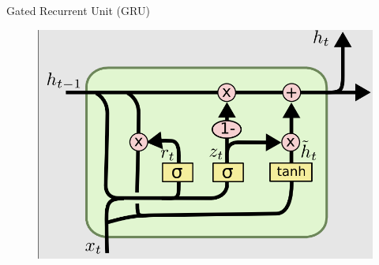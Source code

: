 \begin{frame}{Gated Recurrent Unit (GRU)}

\begin{figure}
    \centering
    \includegraphics[keepaspectratio=true,height=0.8\paperheight,width=0.9\linewidth]{Images/celda gru.png}
\end{figure}
    
\end{frame}